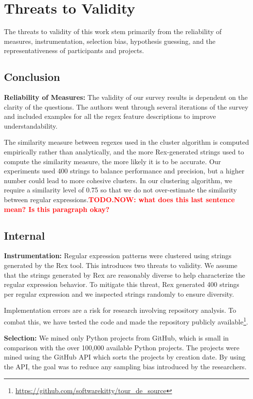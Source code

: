 \documentclass{sig-alternate}
\newcommand{\todoNow}[1]{\textbf{\textcolor{red}{TODO.NOW: #1}}} %
\begin{document}
\section{Threats to Validity}
\label{sec:threats}
The threats to validity of this work stem primarily from the reliability of measures, instrumentation, selection bias, hypothesis guessing, and the representativeness of participants and projects.

\subsection{Conclusion}
\textbf{Reliability of Measures:} The validity of our survey results is dependent on the clarity of the questions. The authors went through several iterations of the survey and included examples for all the regex feature descriptions to improve understandability.

The similarity measure between regexes used in the cluster algorithm is computed empirically rather than analytically, and the more Rex-generated strings used to compute the similarity measure, the more likely it is to be accurate. Our experiments used 400 strings to balance performance and precision, but a higher number could lead to more cohesive clusters. In our clustering algorithm, we require a similarity level of 0.75 so that we do not over-estimate the similarity between regular  expressions.\todoNow{what does this last sentence mean?  Is this paragraph okay?}

\subsection{Internal}

\textbf{Instrumentation:} Regular expression patterns were clustered using strings generated by the Rex tool. This introduces two threats to validity. We assume that the strings generated by Rex are reasonably diverse to help characterize the regular expression behavior. To mitigate this threat, Rex generated 400 strings per regular expression and we inspected strings randomly to ensure diversity.

Implementation errors are a risk for research involving repository analysis. To combat this, we have tested the code and made the repository publicly available\footnote{\url{https://github.com/softwarekitty/tour_de_source}}.

\textbf{Selection:} We mined only  Python projects from GitHub, which is  small in comparison with the over 100,000 available Python projects. The projects were mined using the GitHub API which sorts the projects by creation date. By using the API, the goal was to reduce any sampling bias introduced by the researchers.
\end{document}
